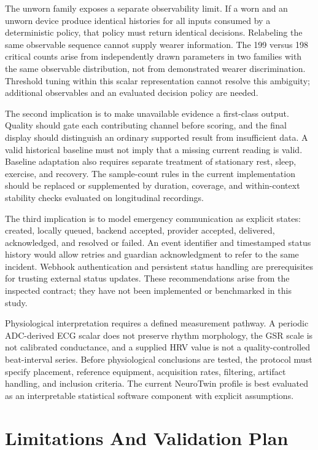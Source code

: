 \documentclass[journal]{IEEEtran}
\begin{document}
The unworn family exposes a separate observability limit. If a worn and an unworn device produce identical histories for all inputs consumed by a deterministic policy, that policy must return identical decisions. Relabeling the same observable sequence cannot supply wearer information. The 199 versus 198 critical counts arise from independently drawn parameters in two families with the same observable distribution, not from demonstrated wearer discrimination. Threshold tuning within this scalar representation cannot resolve this ambiguity; additional observables and an evaluated decision policy are needed.

The second implication is to make unavailable evidence a first-class output. Quality should gate each contributing channel before scoring, and the final display should distinguish an ordinary supported result from insufficient data. A valid historical baseline must not imply that a missing current reading is valid. Baseline adaptation also requires separate treatment of stationary rest, sleep, exercise, and recovery. The sample-count rules in the current implementation should be replaced or supplemented by duration, coverage, and within-context stability checks evaluated on longitudinal recordings.

The third implication is to model emergency communication as explicit states: created, locally queued, backend accepted, provider accepted, delivered, acknowledged, and resolved or failed. An event identifier and timestamped status history would allow retries and guardian acknowledgment to refer to the same incident. Webhook authentication and persistent status handling are prerequisites for trusting external status updates. These recommendations arise from the inspected contract; they have not been implemented or benchmarked in this study.

Physiological interpretation requires a defined measurement pathway. A periodic ADC-derived ECG scalar does not preserve rhythm morphology, the GSR scale is not calibrated conductance, and a supplied HRV value is not a quality-controlled beat-interval series. Before physiological conclusions are tested, the protocol must specify placement, reference equipment, acquisition rates, filtering, artifact handling, and inclusion criteria. The current NeuroTwin profile is best evaluated as an interpretable statistical software component with explicit assumptions.

\section{Limitations And Validation Plan}
\end{document}

